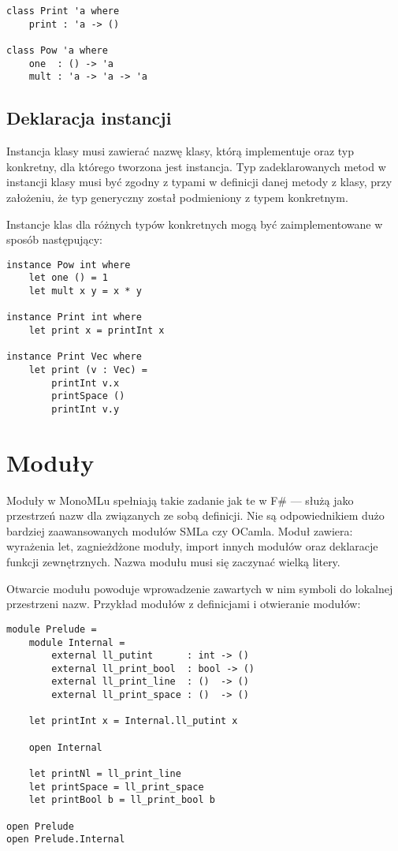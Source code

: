 \documentclass[declaration,shortabstract]{iithesis}
\begin{document}
\begin{lstlisting}[frame=lines]
class Print 'a where 
    print : 'a -> ()
  
class Pow 'a where 
    one  : () -> 'a
    mult : 'a -> 'a -> 'a
\end{lstlisting}

\subsection{Deklaracja instancji}

Instancja klasy musi zawierać nazwę klasy, którą implementuje oraz typ konkretny,
dla którego tworzona jest instancja. Typ zadeklarowanych metod w
instancji klasy musi być zgodny z typami w definicji danej metody z klasy,
przy założeniu, że typ generyczny został podmieniony z typem konkretnym. 

Instancje klas dla różnych typów konkretnych 
mogą być zaimplementowane w sposób następujący:

\begin{lstlisting}[frame=lines]
instance Pow int where
    let one () = 1 
    let mult x y = x * y

instance Print int where 
    let print x = printInt x 

instance Print Vec where 
    let print (v : Vec) = 
        printInt v.x 
        printSpace ()
        printInt v.y
\end{lstlisting}

\section{Moduły}

Moduły w MonoMLu spełniają takie zadanie jak te w F\# --- służą jako 
przestrzeń nazw dla związanych ze sobą definicji. Nie są odpowiednikiem 
dużo bardziej zaawansowanych modułów SMLa czy OCamla.
Moduł zawiera: wyrażenia let, zagnieżdżone moduły, import innych 
modułów oraz deklaracje funkcji zewnętrznych. Nazwa modułu musi się zaczynać 
wielką litery. 

Otwarcie modułu powoduje wprowadzenie zawartych w nim symboli do 
lokalnej przestrzeni nazw. Przykład modułów z definicjami 
i otwieranie modułów:

\begin{lstlisting}[frame=lines]
module Prelude = 
    module Internal = 
        external ll_putint      : int -> () 
        external ll_print_bool  : bool -> () 
        external ll_print_line  : ()  -> () 
        external ll_print_space : ()  -> () 

    let printInt x = Internal.ll_putint x

    open Internal 
    
    let printNl = ll_print_line
    let printSpace = ll_print_space
    let printBool b = ll_print_bool b

open Prelude
open Prelude.Internal
\end{lstlisting}
\end{document}
